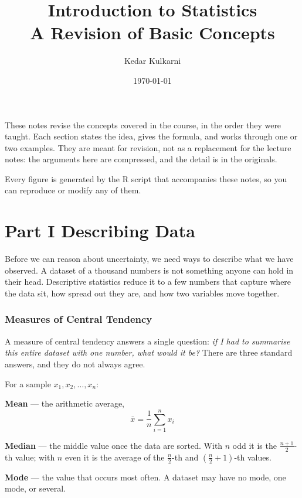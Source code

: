\documentclass[a4paper,11pt]{article}
\title{\vspace{-1.5cm}\textbf{Introduction to Statistics}\\[0.2cm]
       \large A Revision of Basic Concepts}
\author{Kedar Kulkarni}
\date{\today}
\begin{document}
\maketitle

\vspace{-0.8cm}

\begin{keybox}
These notes revise the concepts covered in the course, in the order they were
taught. Each section states the idea, gives the formula, and works through one
or two examples. They are meant for revision, not as a replacement for the
lecture notes: the arguments here are compressed, and the detail is in the
originals.

Every figure is generated by the R script that accompanies these notes, so you
can reproduce or modify any of them.
\end{keybox}

\tableofcontents
\newpage

\clearpage
\part*{Part I \quad Describing Data}

Before we can reason about uncertainty, we need ways to describe what we have
observed. A dataset of a thousand numbers is not something anyone can hold in
their head. Descriptive statistics reduce it to a few numbers that capture where
the data sit, how spread out they are, and how two variables move together.

\section{Measures of Central Tendency}

A measure of central tendency answers a single question: \emph{if I had to
summarise this entire dataset with one number, what would it be?} There are
three standard answers, and they do not always agree.

\begin{keybox}
For a sample $x_1, x_2, \ldots, x_n$:

\textbf{Mean} --- the arithmetic average,
\[ \bar{x} = \frac{1}{n}\sum_{i=1}^{n} x_i \]

\textbf{Median} --- the middle value once the data are sorted. With $n$ odd it
is the $\frac{n+1}{2}$-th value; with $n$ even it is the average of the
$\frac{n}{2}$-th and $\left(\frac{n}{2}+1\right)$-th values.

\textbf{Mode} --- the value that occurs most often. A dataset may have no mode,
one mode, or several.
\end{keybox}
\end{document}
